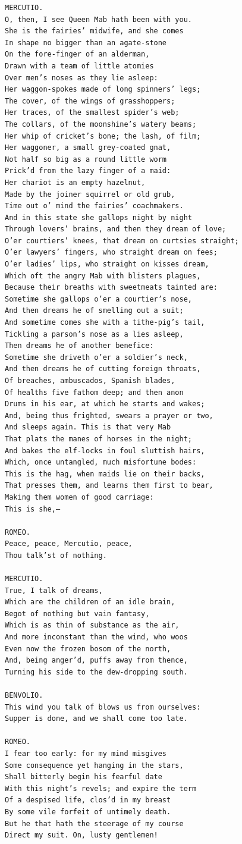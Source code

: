 \documentclass{article}
\begin{document}
\begin{verbatim}
MERCUTIO.
O, then, I see Queen Mab hath been with you.
She is the fairies’ midwife, and she comes
In shape no bigger than an agate-stone
On the fore-finger of an alderman,
Drawn with a team of little atomies
Over men’s noses as they lie asleep:
Her waggon-spokes made of long spinners’ legs;
The cover, of the wings of grasshoppers;
Her traces, of the smallest spider’s web;
The collars, of the moonshine’s watery beams;
Her whip of cricket’s bone; the lash, of film;
Her waggoner, a small grey-coated gnat,
Not half so big as a round little worm
Prick’d from the lazy finger of a maid:
Her chariot is an empty hazelnut,
Made by the joiner squirrel or old grub,
Time out o’ mind the fairies’ coachmakers.
And in this state she gallops night by night
Through lovers’ brains, and then they dream of love;
O’er courtiers’ knees, that dream on curtsies straight;
O’er lawyers’ fingers, who straight dream on fees;
O’er ladies’ lips, who straight on kisses dream,
Which oft the angry Mab with blisters plagues,
Because their breaths with sweetmeats tainted are:
Sometime she gallops o’er a courtier’s nose,
And then dreams he of smelling out a suit;
And sometime comes she with a tithe-pig’s tail,
Tickling a parson’s nose as a lies asleep,
Then dreams he of another benefice:
Sometime she driveth o’er a soldier’s neck,
And then dreams he of cutting foreign throats,
Of breaches, ambuscados, Spanish blades,
Of healths five fathom deep; and then anon
Drums in his ear, at which he starts and wakes;
And, being thus frighted, swears a prayer or two,
And sleeps again. This is that very Mab
That plats the manes of horses in the night;
And bakes the elf-locks in foul sluttish hairs,
Which, once untangled, much misfortune bodes:
This is the hag, when maids lie on their backs,
That presses them, and learns them first to bear,
Making them women of good carriage:
This is she,—

ROMEO.
Peace, peace, Mercutio, peace,
Thou talk’st of nothing.

MERCUTIO.
True, I talk of dreams,
Which are the children of an idle brain,
Begot of nothing but vain fantasy,
Which is as thin of substance as the air,
And more inconstant than the wind, who woos
Even now the frozen bosom of the north,
And, being anger’d, puffs away from thence,
Turning his side to the dew-dropping south.

BENVOLIO.
This wind you talk of blows us from ourselves:
Supper is done, and we shall come too late.

ROMEO.
I fear too early: for my mind misgives
Some consequence yet hanging in the stars,
Shall bitterly begin his fearful date
With this night’s revels; and expire the term
Of a despised life, clos’d in my breast
By some vile forfeit of untimely death.
But he that hath the steerage of my course
Direct my suit. On, lusty gentlemen!


\end{verbatim}
\end{document}
